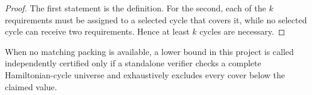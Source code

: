 \begin{proof}
The first statement is the definition.  For the second, each of the \(k\)
requirements must be assigned to a selected cycle that covers it, while no
selected cycle can receive two requirements.  Hence at least \(k\) cycles are
necessary.
\end{proof}

When no matching packing is available, a lower bound in this project is called
independently certified only if a standalone verifier checks a complete
Hamiltonian-cycle universe and exhaustively excludes every cover below the
claimed value.
